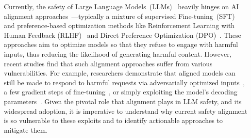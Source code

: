 Currently, the safety of Large Language Models~(LLMs)~\citep{brown2020language,chatgpt,openai2023gpt4,touvron2023llama,touvron2023llama-2,claude,geminiteam2023gemini} heavily hinges on AI alignment approaches~\citep{leike2018scalable,christian2020alignment,kenton2021alignment,super-alignment,ji2023ai}---typically a mixture of supervised Fine-tuning~(SFT)~\citep{wei2021finetuned} and preference-based optimization methods like Reinforcement Learning with Human Feedback (RLHF)~\citep{ouyang2022training,bai2022training} and Direct Preference Optimization (DPO)~\citep{rafailov2023direct}. 
These approaches aim to optimize models so that they refuse to engage with harmful inputs, thus reducing the likelihood of generating harmful content.
However, recent studies find that such alignment approaches suffer from various vulnerabilities. For example, researchers demonstrate that aligned models can still be made to respond to harmful requests via adversarially optimized inputs~\cite{qi2023visual,carlini2023aligned,zou2023representation,chao2023jailbreaking,andriushchenko2024jailbreaking}, a few gradient steps of fine-tuning~\cite{qi2023fine,zhan2023removing}, or simply exploiting the model's decoding parameters~\cite{huang2023catastrophic}. 
Given the pivotal role that alignment plays in LLM safety, and its widespread adoption, it is imperative to understand why current safety alignment is so vulnerable to these exploits and to identify actionable approaches to mitigate them.



